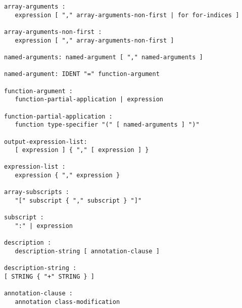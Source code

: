 \begin{lstlisting}[language=grammar]
array-arguments :
   expression [ "," array-arguments-non-first | for for-indices ]

array-arguments-non-first :
   expression [ "," array-arguments-non-first ]

named-arguments: named-argument [ "," named-arguments ]

named-argument: IDENT "=" function-argument

function-argument :
   function-partial-application | expression

function-partial-application :
   function type-specifier "(" [ named-arguments ] ")"

output-expression-list:
   [ expression ] { "," [ expression ] }

expression-list :
   expression { "," expression }

array-subscripts :
   "[" subscript { "," subscript } "]"

subscript :
   ":" | expression

description :
   description-string [ annotation-clause ]

description-string :
[ STRING { "+" STRING } ]

annotation-clause :
   annotation class-modification
\end{lstlisting}
